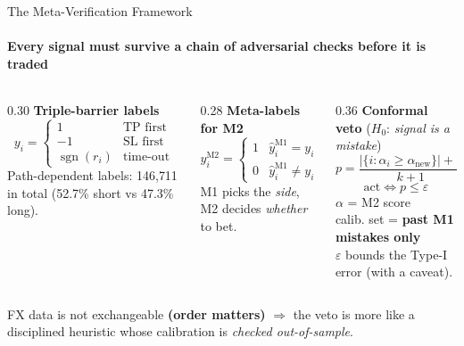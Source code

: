 \documentclass[aspectratio=169, 11pt]{beamer}
\newcommand{\hl}[1]{\textcolor{unibored}{\textbf{#1}}}
\begin{document}
\begin{frame}{The Meta-Verification Framework}
  \framesubtitle{Every signal must survive a chain of adversarial checks before it is traded}
  \begin{center}
  \end{center}
  \vspace{-1mm}
  \footnotesize
  \begin{columns}[T,onlytextwidth]
    \begin{column}{0.30\textwidth}
      \textbf{\small Triple-barrier labels}
      \[
        y_i = \begin{cases}
           1 & \text{TP first} \\
          -1 & \text{SL first} \\
          \operatorname{sgn}(r_i) & \text{time-out}
        \end{cases}
      \]
      Path-dependent labels: 146{,}711 in total (52.7\% short vs 47.3\% long).
    \end{column}
    \begin{column}{0.28\textwidth}
      \textbf{\small Meta-labels for M2}
      \[
        y_i^{\text{M2}} = \begin{cases}
          1 & \hat{y}_i^{\text{M1}} = y_i \\
          0 & \hat{y}_i^{\text{M1}} \neq y_i
        \end{cases}
      \]
      M1 picks the \emph{side}, M2 decides \emph{whether} to bet.
    \end{column}
    \begin{column}{0.36\textwidth}
      \textbf{\small Conformal veto}\; ($H_0$: \emph{signal is a mistake})
      \[
        p = \frac{\big|\{i : \alpha_i \geq \alpha_{\text{new}}\}\big| + 1}{k+1}
      \]
      \vspace{-3mm}
      \[
        \text{act} \iff p \leq \varepsilon
      \]
      $\alpha$ = M2 score\\
      calib. set = \hl{past M1 mistakes only}\\
      $\varepsilon$ bounds the Type-I error (with a caveat).
    \end{column}
  \end{columns}
  \vfill
  {\footnotesize\color{muted} FX data is not exchangeable \hl{(order matters)} $\Rightarrow$ the veto is more like a disciplined heuristic whose calibration is \emph{checked out-of-sample}.}
\end{frame}
\end{document}
